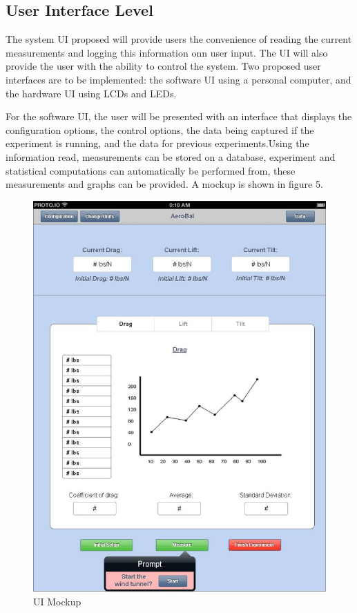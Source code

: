 	\subsection{User Interface Level}

		The system UI proposed will provide users the convenience of reading the current measurements and logging this information onn user input. The UI will also provide the user with the ability to control the system. Two proposed user interfaces are to be implemented: the software UI using a personal computer, and the hardware UI using LCDs and LEDs.

		For the software UI, the user will be presented with an interface that displays the configuration options, the control options, the data being captured if the experiment is running, and the data for previous experiments.Using the information read, measurements can be stored on a database, experiment and statistical computations can automatically be performed from, these measurements and graphs can be provided. A mockup is shown in figure 5.

		\begin{figure}[H]
			\centering
				\includegraphics[scale=0.40]{img/UI-PC}
			\caption{UI Mockup}
		\end{figure}

